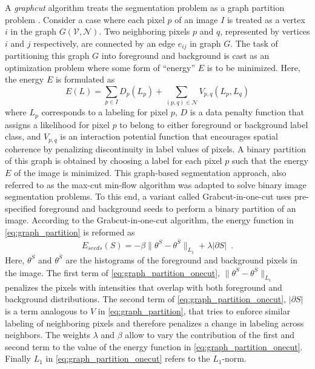 \documentclass {udthesis}
\begin{document}
A \textit{graphcut} algorithm treats the segmentation problem as a graph partition problem \cite{mincut_maxflow}. Consider a case where each pixel $p$ of an image $I$ is treated as a vertex $i$ in the graph $G(\mathcal{V},\mathcal{N})$. Two neighboring pixels $p$ and $q$, represented by vertices $i$ and $j$ respectively, are connected by an edge $e_{ij}$ in graph $G$. The task of partitioning this graph $G$ into foreground and background is cast as an optimization problem where some form of ``energy'' $E$ is to be minimized. Here, the energy $E$ is formulated as 
%
\begin{equation}	\label{eq:graph_partition}
  E(L)=\sum\limits_{p\in I} D_p(L_p)+\sum\limits_{(p,q)\in \mathcal{N}} V_{p,q} (L_p,L_q)
\end{equation}
%
where $L_p$ corresponds to a labeling for pixel $p$, $D$ is a data penalty function that assigns a likelihood for pixel $p$ to belong to either foreground or background label class, and $V_{p,q}$ is an interaction potential function that encourages spatial coherence by penalizing discontinuity in label values of pixels. A binary partition of this graph is obtained by choosing a label for each pixel $p$ such that the energy $E$ of the image is minimized. This graph-based segmentation approach, also referred to as the max-cut min-flow algorithm was adapted to solve binary image segmentation problems. To this end, a variant called Grabcut-in-one-cut \cite{onecut} uses pre-specified foreground and background seeds to perform a binary partition of an image. According to the Grabcut-in-one-cut algorithm, the energy function in \eqref{eq:graph_partition} is reformed as
%
\begin{equation} \label{eq:graph_partition_onecut}
  E_{seeds}(S)=-\beta \| \theta^S-\theta^{\bar{S}} \|_{L_1}+\lambda|\partial S|\enspace.
\end{equation}
%
Here, $\theta^S$ and $\theta^{\bar{S}}$ are the histograms of the foreground and background pixels in the image. The first term 
of \eqref{eq:graph_partition_onecut}, $\| \theta^S-\theta^{\bar{S}} \|_{L_1}$ penalizes the pixels with intensities that overlap with both foreground and background distributions. The second term of \eqref{eq:graph_partition_onecut}, $|\partial S|$ is a term analogous to $V$ in \eqref{eq:graph_partition}, that tries to enforce similar labeling of neighboring pixels and therefore penalizes a change in labeling across neighbors. The weights $\lambda$ and $\beta$ allow to vary the contribution of the first and second term to the value of the energy function in \eqref{eq:graph_partition_onecut}. Finally $L_1$ in \eqref{eq:graph_partition_onecut} refers to the $L_1$-norm.
\end{document}
